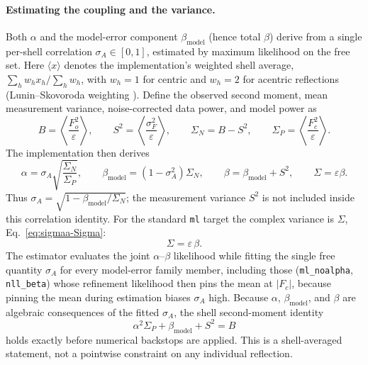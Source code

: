 \documentclass{iucrjournals}
\begin{document}
\paragraph{Estimating the coupling and the variance.}
Both $\alpha$ and the model-error component $\beta_\mathrm{model}$ (hence total
$\beta$) derive from a single per-shell
correlation $\sigma_{A}\in[0,1]$, estimated by maximum likelihood on the free
set. Here $\langle x\rangle$ denotes the implementation's weighted shell average,
$\sum_h w_hx_h/\sum_h w_h$, with $w_h=1$ for centric and $w_h=2$ for acentric
reflections (Lunin--Skovoroda weighting \cite{lunin_rfree_1995}). Define the observed second moment, mean
measurement variance, noise-corrected data power, and model power as
%
\begin{equation}
  B = \left\langle\frac{F_o^2}{\varepsilon}\right\rangle,
  \qquad
  S^2 = \left\langle\frac{\sigma_F^2}{\varepsilon}\right\rangle,
  \qquad
  \Sigma_N = B-S^2,
  \qquad
  \Sigma_P = \left\langle\frac{F_c^2}{\varepsilon}\right\rangle.
  \label{eq:sigmaa-moments}
\end{equation}
%
The implementation then derives
%
\begin{equation}
  \alpha = \sigma_A\sqrt{\frac{\Sigma_N}{\Sigma_P}},
  \qquad
  \beta_\mathrm{model}=(1-\sigma_A^2)\Sigma_N,
  \qquad
  \beta=\beta_\mathrm{model}+S^2,
  \qquad
  \Sigma=\varepsilon\beta.
  \label{eq:sigmaa-decomposition}
\end{equation}
%
Thus $\sigma_A=\sqrt{1-\beta_\mathrm{model}/\Sigma_N}$; the measurement
variance $S^2$ is not included inside this correlation identity. For the
standard \texttt{ml} target the complex variance is $\Sigma$,
Eq.~\ref{eq:sigmaa-Sigma}:
%
\begin{equation}
  \Sigma = \varepsilon\,\beta.
  \label{eq:sigmaa-Sigma}
\end{equation}
%
The estimator evaluates the joint $\alpha$--$\beta$ likelihood while fitting the
single free quantity $\sigma_A$ for every model-error family member, including
those (\texttt{ml\_noalpha}, \texttt{nll\_beta}) whose refinement likelihood then
pins the mean at $|F_{c}|$, because pinning the mean during estimation biases
$\sigma_{A}$ high. Because $\alpha$, $\beta_\mathrm{model}$, and $\beta$ are
algebraic consequences of the fitted $\sigma_A$, the shell second-moment identity
%
\begin{equation}
  \alpha^{2}\Sigma_{P} + \beta_\mathrm{model} + S^{2} = B
  \label{eq:sigmaa-identity}
\end{equation}
%
holds exactly before numerical backstops are applied. This is a shell-averaged
statement, not a pointwise constraint on any individual reflection.
\end{document}
